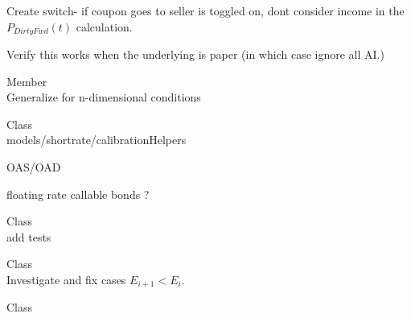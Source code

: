 \begin{DoxyRefList}
\label{todo__todo000038}%
%
Create switch-\/ if coupon goes to seller is toggled on, don\textquotesingle{}t consider income in the $ P_{DirtyFwd}(t) $ calculation.

\label{todo__todo000039}%
%
Verify this works when the underlying is paper (in which case ignore all AI.) 
\item[Member \doxylink{class_quant_lib_1_1_boundary_condition_ab685ab8e5ea909d20f659fab031a3dcb}{Quant\+Lib\+::Boundary\+Condition\texorpdfstring{$<$}{<} Operator \texorpdfstring{$>$}{>}\+::Side} ]\hfill \\
\label{todo__todo000055}%
%
Generalize for n-\/dimensional conditions  
\item[Class \doxylink{class_quant_lib_1_1_callable_bond}{Quant\+Lib\+::Callable\+Bond} ]\hfill \\
\label{todo__todo000007}%
%
models/shortrate/calibration\+Helpers 



OAS/\+OAD 



floating rate callable bonds ? 
\item[Class \doxylink{class_quant_lib_1_1_cash_flows}{Quant\+Lib\+::Cash\+Flows} ]\hfill \\
\label{todo__todo000001}%
%
add tests  
\item[Class \doxylink{class_quant_lib_1_1_c_d_o}{Quant\+Lib\+::CDO} ]\hfill \\
\label{todo__todo000011}%
%
Investigate and fix cases $ E_{i+1} < E_i. $  
\item[Class \doxylink{class_quant_lib_1_1_cliquet_option}{Quant\+Lib\+::Cliquet\+Option} ]\hfill \\
\label{todo__todo000040}%
%


\end{DoxyRefList}
